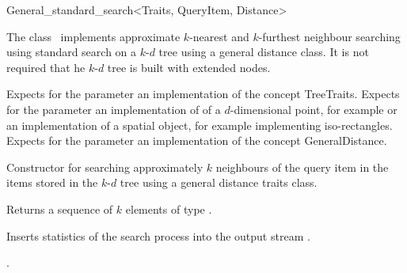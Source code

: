 

\begin{ccRefClass}{General_standard_search<Traits, QueryItem, Distance>}  %


\ccDefinition
  
The class \ccRefName\ implements approximate $k$-nearest and $k$-furthest neighbour searching
using standard search on a $k$-$d$ tree using a general distance 
class. It is not required that he $k$-$d$ tree is built with extended nodes.


\ccParameters

Expects for the parameter  an implementation of the concept TreeTraits.
Expects for the parameter   an implementation of
of a $d$-dimensional point, for example 
or an implementation of a spatial object, for
example  implementing iso-rectangles.
Expects for the parameter  an implementation of the
concept GeneralDistance.

\ccTypes


\ccCreation
{}  %

{Constructor for searching approximately $k$ neighbours of the query item  
in the items stored in the $k$-$d$ tree  using a general distance
traits class.} 


{Returns a sequence of $k$ elements of type }. 

{
Inserts statistics of the search process into the output stream .
}

\ccSeeAlso

.

\end{ccRefClass}


